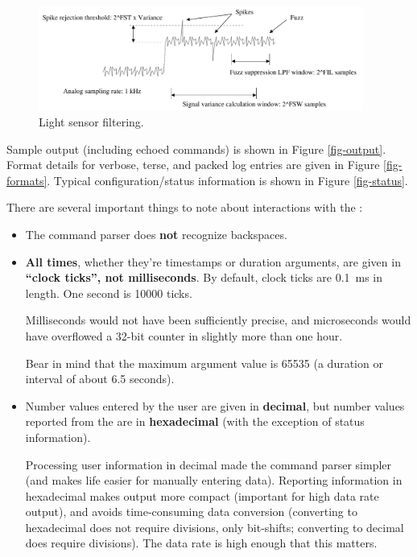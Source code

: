 \begin{figure}[p]
\includegraphics[width=0.95\textwidth]{figs/swfilter.pdf}
\caption{Light sensor filtering.}
\label{fig-filtering}
\end{figure}

Sample output (including echoed commands) is shown in Figure 
\ref{fig-output}. Format details for verbose, terse, and packed log entries
are given in Figure \ref{fig-formats}. Typical configuration/status
information is shown in Figure \ref{fig-status}.

There are several important things to note about interactions with the 
{\projectname}:

\begin{itemize}
\item The command parser does \textbf{not} recognize backspaces.

\item \textbf{All times}, whether they're timestamps or duration 
arguments, are given in \textbf{``clock ticks'', not milliseconds}. By 
default, clock ticks are 0.1~ms in length. One second is 10000 ticks.

Milliseconds would not have been sufficiently precise, and microseconds 
would have overflowed a 32-bit counter in slightly more than one hour.

Bear in mind that the maximum argument value is 65535 (a duration or 
interval of about 6.5 seconds).

\clearpage
\item Number values entered by the user are given in \textbf{decimal}, but 
number values reported from the {\projectname} are in \textbf{hexadecimal} 
(with the exception of status information).

Processing user information in decimal made the command parser simpler 
(and makes life easier for manually entering data). Reporting information 
in hexadecimal makes output more compact (important for high data rate 
output), and avoids time-consuming data conversion (converting to 
hexadecimal does not require divisions, only bit-shifts; converting to 
decimal does require divisions). The data rate is high enough that this 
matters.
\end{itemize}

